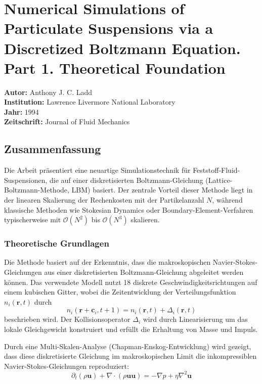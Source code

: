 \documentclass[a4paper,12pt]{article}
\begin{document}
\section*{Numerical Simulations of Particulate Suspensions via a Discretized Boltzmann Equation. Part 1. Theoretical Foundation}

\textbf{Autor:} Anthony J. C. Ladd \\
\textbf{Institution:} Lawrence Livermore National Laboratory \\
\textbf{Jahr:} 1994 \\
\textbf{Zeitschrift:} Journal of Fluid Mechanics

\subsection*{Zusammenfassung}

Die Arbeit pr\"asentiert eine neuartige Simulationstechnik f\"ur Feststoff-Fluid-Suspensionen, die auf einer diskretisierten Boltzmann-Gleichung (Lattice-Boltzmann-Methode, LBM) basiert. Der zentrale Vorteil dieser Methode liegt in der linearen Skalierung der Rechenkosten mit der Partikelanzahl $N$, w\"ahrend klassische Methoden wie Stokesian Dynamics oder Boundary-Element-Verfahren typischerweise mit $\mathcal{O}(N^2)$ bis $\mathcal{O}(N^3)$ skalieren.

\subsubsection*{Theoretische Grundlagen}

Die Methode basiert auf der Erkenntnis, dass die makroskopischen Navier-Stokes-Gleichungen aus einer diskretisierten Boltzmann-Gleichung abgeleitet werden k\"onnen. Das verwendete Modell nutzt 18 diskrete Geschwindigkeitsrichtungen auf einem kubischen Gitter, wobei die Zeitentwicklung der Verteilungsfunktion $n_i(\mathbf{r}, t)$ durch
\begin{equation}
n_i(\mathbf{r} + \mathbf{c}_i, t + 1) = n_i(\mathbf{r}, t) + \Delta_i(\mathbf{r}, t)
\end{equation}
beschrieben wird. Der Kollisionsoperator $\Delta_i$ wird durch Linearisierung um das lokale Gleichgewicht konstruiert und erf\"ullt die Erhaltung von Masse und Impuls.

Durch eine Multi-Skalen-Analyse (Chapman-Enskog-Entwicklung) wird gezeigt, dass diese diskretisierte Gleichung im makroskopischen Limit die inkompressiblen Navier-Stokes-Gleichungen reproduziert:
\begin{equation}
\partial_t(\rho \mathbf{u}) + \nabla \cdot (\rho \mathbf{u}\mathbf{u}) = -\nabla p + \eta \nabla^2 \mathbf{u}
\end{equation}
\end{document}
